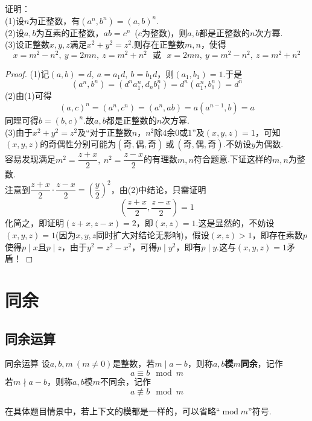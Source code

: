 \documentclass[lang=cn, zihao=5]{elegantbook}
\newcommand{\ssb}[1]{\left( #1 \right)}
\newcommand{\cor}{~\textit{或}~}
\begin{document}
\begin{example}
	证明： \\
	(1)设$n$为正整数，有$(a^n,b^n)=(a,b)^n$. \\
	(2)设$a,b$为互素的正整数，$ab=c^n$~($c$为整数)，则$a,b$都是正整数的$n$次方幂. \\
	(3)设正整数$x,y,z$满足$x^2+y^2=z^2$.则存在正整数$m,n$，使得$$x=m^2-n^2,~y=2mn,~z=m^2+n^2 ~~\cor ~~ x=2mn,~y=m^2-n^2,~z=m^2+n^2$$
\end{example}
\begin{proof}
	(1)记$(a,b)=d,~a=a_1d,~b=b_1d$，则$(a_1,b_1)=1$.于是$$(a^n,b^n)=(d^na_1^n,d_nb_1^n)=d^n(a_1^n,b_1^n)=d^n$$
	(2)由(1)可得$$(a,c)^n = (a^n,c^n) = (a^n,ab) = a(a^{n-1},b) = a$$
	同理可得$b=(b,c)^n$.故$a,b$都是正整数的$n$次方幂. \\
	(3)由于$x^2+y^2=z^2$及“对于正整数$n$，$n^2$除$4$余$0$或$1$”及$(x,y,z)=1$，可知$(x,y,z)$的奇偶性分别可能为$(\textit{奇},\textit{偶},\textit{奇})\cor (\textit{奇},\textit{偶},\textit{奇})$.不妨设$y$为偶数. \\
	容易发现满足$m^2=\dfrac{z+x}{2},~n^2=\dfrac{z-x}{2}$的有理数$m,n$符合题意.下证这样的$m,n$为整数. \\
	注意到$\dfrac{z+x}{2} \cdot \dfrac{z-x}{2} = \ssb{\dfrac{y}{2}}^2$，由(2)中结论，只需证明$$\ssb{\frac{z+x}{2}, \frac{z-x}{2}}=1$$
	化简之，即证明$(z+x,z-x)=2$，即$(x,z)=1$.这是显然的，不妨设$(x,y,z)=1$(因为$x,y,z$同时扩大对结论无影响)，假设$(x,z)>1$，即存在素数$p$使得$p \mid x$且$p \mid z$，由于$y^2=z^2-x^2$，可得$p \mid y^2$，即有$p \mid y$.这与$(x,y,z)=1$矛盾！
\end{proof}

\chapter{同余}

\section{同余运算}

\begin{definition}{同余运算}
	设$a,b,m~(m \neq 0)$是整数，若$m \mid a-b$，则称$a,b$\textbf{模$m$同余}，记作$$a \equiv b \mod m$$
	若$m \nmid a-b$，则称$a,b$模$m$不同余，记作$$a \not\equiv b \mod m$$
\end{definition}
\begin{remark}
	在具体题目情景中，若上下文的模都是一样的，可以省略“$\operatorname{mod} m$”符号.
\end{remark}
\end{document}
